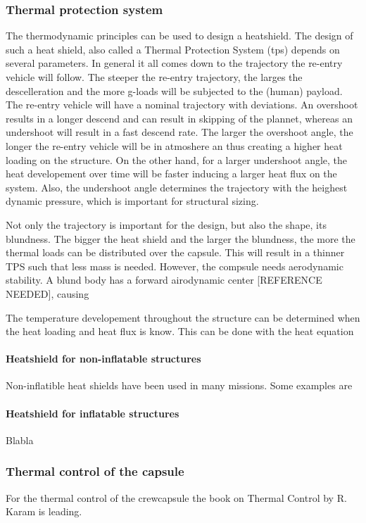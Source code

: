 \subsubsection{Thermal protection system}
The thermodynamic principles can be used to design a heatshield. The design of such a heat shield, also called a Thermal Protection System (\gls{tps}) depends on several parameters. In general it all comes down to the trajectory the re-entry vehicle will follow. The steeper the re-entry trajectory, the larges the descelleration and the more g-loads will be subjected to the (human) payload. The re-entry vehicle will have a nominal trajectory with deviations. An overshoot results in a longer descend and can result in skipping of the plannet, whereas an undershoot will result in a fast descend rate. The larger the overshoot angle, the longer the re-entry vehicle will be in atmoshere an thus creating a higher heat loading on the structure. On the other hand, for a larger undershoot angle, the heat developement over time will be faster inducing a larger heat flux on the system. Also, the undershoot angle determines the trajectory with the heighest dynamic pressure, which is important for structural sizing. 

Not only the trajectory is important for the design, but also the shape, its blundness. The bigger the heat shield and the larger the blundness, the more the  thermal loads can be distributed over the capsule. This will result in a thinner TPS such that less mass is needed. However, the compsule needs aerodynamic stability. A blund body has a forward airodynamic center [REFERENCE NEEDED], causing 

The temperature developement throughout the structure can be determined when the heat loading and heat flux is know. This can be done with the heat equation 

\paragraph{Heatshield for non-inflatable structures}

Non-inflatible heat shields have been used in many missions. Some examples are 

\paragraph{Heatshield for inflatable structures}

Blabla

\subsubsection{Thermal control of the capsule}
For the thermal control of the crewcapsule the book on Thermal Control by R. Karam is leading. \cite{Karam1998}




